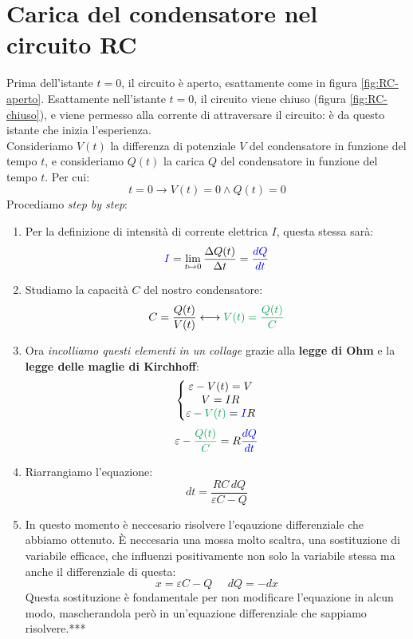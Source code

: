 \documentclass[a3paper, twoside, openany]{book}
\theoremstyle{definition}
\begin{document}
\section{Carica del condensatore nel circuito RC}
Prima dell'istante $t=0$, il circuito è aperto, esattamente come in figura \ref{fig:RC-aperto}. Esattamente nell'istante $t=0$, il circuito viene chiuso (figura \ref{fig:RC-chiuso}), e viene permesso alla corrente di attraversare il circuito: è da questo istante che inizia l'esperienza. \\ Consideriamo $V(t)$ la differenza di potenziale $V$ del condensatore in funzione del tempo $t$, e consideriamo $Q(t)$ la carica $Q$ del condensatore in funzione del tempo $t$. Per cui: $$t=0\longrightarrow V(t)=0 \wedge Q(t)=0$$ Procediamo \emph{step by step}:
\begin{enumerate}
\item Per la definizione di intensità di corrente elettrica $I$, questa stessa sarà: \begin{equation}\textcolor{blue}{I}=\lim_{t\mapsto 0}\frac{\Delta Q(t)}{\Delta t}=\textcolor{blue}{\frac{dQ}{dt}}\end{equation}\label{eq:intensità}
\item Studiamo la capacità $C$ del nostro condensatore: \begin{equation}C=\frac{Q(t)}{V(t)}\longleftrightarrow \textcolor{Green}{V(t)=\frac{Q(t)}{C}}\end{equation}
\item Ora \emph{incolliamo questi elementi in un collage} grazie alla \textbf{legge di Ohm} e la \textbf{legge delle maglie di Kirchhoff}:
\begin{equation}\left\{
\begin{matrix}
\varepsilon-V(t)=V\\
V=IR\\
\varepsilon-\textcolor{Green}{V(t)}=\textcolor{blue}{I}R
\end{matrix}
\right.\end{equation} \begin{equation}\varepsilon-\textcolor{Green}{\frac{Q(t)}{C}}=R\textcolor{blue}{\frac{dQ}{dt}}\end{equation}
\item Riarrangiamo l'equazione: \begin{equation}dt=\frac{RC\,dQ}{\varepsilon C-Q}\end{equation}
\item In questo momento è neccesario risolvere l'eqauzione differenziale che abbiamo ottenuto. È neccesaria una mossa molto scaltra, una sostituzione di variabile efficace, che influenzi positivamente non solo la variabile stessa ma anche il differenziale di questa: \begin{equation}x=\varepsilon C-Q\;\;\;\;\;dQ=-dx\end{equation}\label{eq:sostituzione} Questa sostituzione è fondamentale per non modificare l'equazione in alcun modo, mascherandola però in un'equazione differenziale che sappiamo risolvere.***

\end{enumerate}
\end{document}
